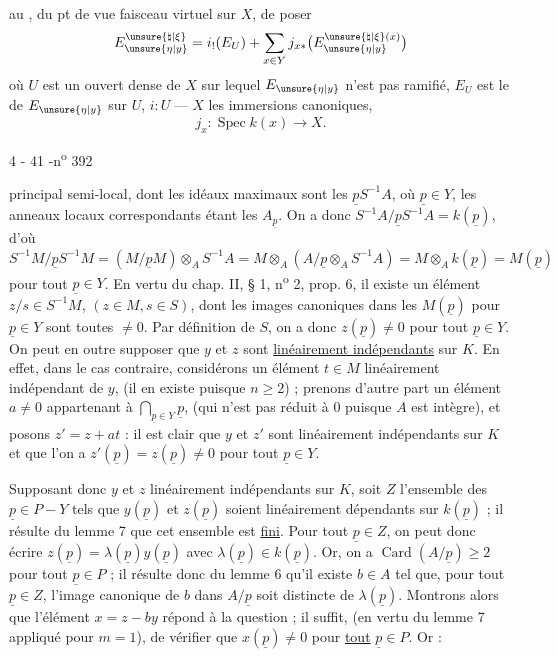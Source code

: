  au , du pt de vue faisceau virtuel sur $X$, de poser
\[
E_{\unsure{\eta|y}}^{\unsure{\natural|\xi}}=i_!(E_U)+\sum_{x\in Y}j_{x*}\bigl(E_{\unsure{\eta|y}}^{\unsure{\natural|\xi}(x)}\bigr)
\]
où $U$ est un ouvert dense de $X$ sur lequel $E_{\unsure{\eta|y}}$ n'est pas ramifié, $E_U$ est le  de $E_{\unsure{\eta|y}}$ sur $U$,  $i:U\mathrel{\text{---}}X$  les immersions canoniques,
\[
j_x:\operatorname{Spec} k(x)\longrightarrow X.
\]


\begin{center}4 - 41 -\hfill n\textsuperscript{o} 392\end{center}

principal semi-local, dont les idéaux maximaux sont les $\underline{p}S^{-1}A$, où $\underline{p}\in Y$, les anneaux locaux correspondants étant les $A_{\underline{p}}$. On a donc $S^{-1}A/\underline{p}S^{-1}A=k(\underline{p})$, d'où $S^{-1}M/\underline{p}S^{-1}M=(M/\underline{p}M)\otimes_A S^{-1}A=M\otimes_A(A/\underline{p}\otimes_A S^{-1}A)=M\otimes_A k(\underline{p})=M(\underline{p})$ pour tout $\underline{p}\in Y$. En vertu du chap. II, § 1, n\textsuperscript{o} 2, prop. 6, il existe un élément $z/s\in S^{-1}M$, $(z\in M,s\in S)$, dont les images canoniques dans les $M(\underline{p})$ pour $\underline{p}\in Y$ sont toutes $\ne0$. Par définition de $S$, on a donc $z(\underline{p})\ne0$ pour tout $\underline{p}\in Y$. On peut en outre supposer que $y$ et $z$ sont \uline{linéairement indépendants} sur $K$. En effet, dans le cas contraire, considérons un élément $t\in M$ linéairement indépendant de $y$, (il en existe puisque $n\ge2$) ; prenons d'autre part un élément $a\ne0$ appartenant à $\bigcap_{\underline{p}\in Y}\underline{p}$, (qui n'est pas réduit à $0$ puisque $A$ est intègre), et posons $z'=z+at$ : il est clair que $y$ et $z'$ sont linéairement indépendants sur $K$ et que l'on a $z'(\underline{p})=z(\underline{p})\ne0$ pour tout $\underline{p}\in Y$.

Supposant donc $y$ et $z$ linéairement indépendants sur $K$, soit $Z$ l'ensemble des $\underline{p}\in P-Y$ tels que $y(\underline{p})$ et $z(\underline{p})$ soient linéairement dépendants sur $k(\underline{p})$ ; il résulte du lemme 7 que cet ensemble est \uline{fini}. Pour tout $\underline{p}\in Z$, on peut donc écrire $z(\underline{p})=\lambda(\underline{p})y(\underline{p})$ avec $\lambda(\underline{p})\in k(\underline{p})$. Or, on a $\operatorname{Card}(A/\underline{p})\ge2$ pour tout $\underline{p}\in P$ ; il résulte donc du lemme 6 qu'il existe $b\in A$ tel que, pour tout $\underline{p}\in Z$, l'image canonique de $b$ dans $A/\underline{p}$ soit distincte de $\lambda(\underline{p})$. Montrons alors que l'élément $x=z-by$ répond à la question ; il suffit, (en vertu du lemme 7 appliqué pour $m=1$), de vérifier que $x(\underline{p})\ne0$ pour \uline{tout} $\underline{p}\in P$. Or :

